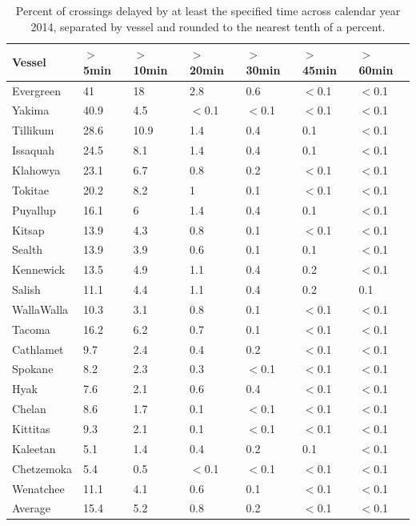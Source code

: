\documentclass[11pt, letterpaper]{article}
\begin{document}
\begin{table}[ht]
\centering
\begin{tabular}{lllllll}
  \hline
 Vessel & $>$5min & $>$10min & $>$20min & $>$30min & $>$45min & $>$60min \\ 
  \hline
Evergreen & 41 & 18 & 2.8 & 0.6 & $<$0.1 & $<$0.1 \\ 
Yakima & 40.9 & 4.5 & $<$0.1 & $<$0.1 & $<$0.1 & $<$0.1 \\ 
 Tillikum & 28.6 & 10.9 & 1.4 & 0.4 & 0.1 & $<$0.1 \\ 
 Issaquah & 24.5 & 8.1 & 1.4 & 0.4 & 0.1 & $<$0.1 \\ 
 Klahowya & 23.1 & 6.7 & 0.8 & 0.2 & $<$0.1 & $<$0.1 \\ 
 Tokitae & 20.2 & 8.2 & 1 & 0.1 & $<$0.1 & $<$0.1 \\ 
 Puyallup & 16.1 & 6 & 1.4 & 0.4 & 0.1 & $<$0.1 \\ 
 Kitsap & 13.9 & 4.3 & 0.8 & 0.1 & $<$0.1 & $<$0.1 \\ 
 Sealth & 13.9 & 3.9 & 0.6 & 0.1 & 0.1 & $<$0.1 \\ 
Kennewick & 13.5 & 4.9 & 1.1 & 0.4 & 0.2 & $<$0.1 \\ 
 Salish & 11.1 & 4.4 & 1.1 & 0.4 & 0.2 & 0.1 \\ 
 WallaWalla & 10.3 & 3.1 & 0.8 & 0.1 & $<$0.1 & $<$0.1 \\ 
 Tacoma & 16.2 & 6.2 & 0.7 & 0.1 & $<$0.1 & $<$0.1 \\ 
 Cathlamet & 9.7 & 2.4 & 0.4 & 0.2 & $<$0.1 & $<$0.1 \\ 
 Spokane & 8.2 & 2.3 & 0.3 & $<$0.1 & $<$0.1 & $<$0.1 \\ 
 Hyak & 7.6 & 2.1 & 0.6 & 0.4 & $<$0.1 & $<$0.1 \\ 
 Chelan & 8.6 & 1.7 & 0.1 & $<$0.1 & $<$0.1 & $<$0.1 \\ 
 Kittitas & 9.3 & 2.1 & 0.1 & $<$0.1 & $<$0.1 & $<$0.1 \\ 
 Kaleetan & 5.1 & 1.4 & 0.4 & 0.2 & 0.1 & $<$0.1 \\ 
 Chetzemoka & 5.4 & 0.5 & $<$0.1 & $<$0.1 & $<$0.1 & $<$0.1 \\ 
 Wenatchee & 11.1 & 4.1 & 0.6 & 0.1 & $<$0.1 & $<$0.1 \\ 
   \hline
 Average & 15.4 & 5.2 & 0.8 & 0.2 & $<$0.1 & $<$0.1 \\ 
   \hline
\end{tabular}
 \caption{Percent of crossings delayed by at least the specified time across calendar year 2014, separated by vessel and rounded to the nearest tenth of a percent. }
\label{vesseltable}
\end{table}
\end{document}
